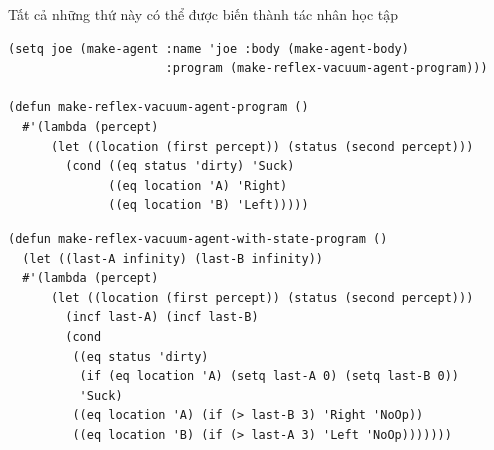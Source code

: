 \documentclass{article}
\begin{document}
\begin{huge}
Tất cả những thứ này có thể được biến thành tác nhân học tập



\textwidth
{}



\medskip



\bigskip

\begin{verbatim}
(setq joe (make-agent :name 'joe :body (make-agent-body)
                      :program (make-reflex-vacuum-agent-program)))

(defun make-reflex-vacuum-agent-program ()
  #'(lambda (percept)
      (let ((location (first percept)) (status (second percept)))
        (cond ((eq status 'dirty) 'Suck)
              ((eq location 'A) 'Right)
              ((eq location 'B) 'Left)))))
\end{verbatim}




\textwidth
{}



\medskip



\bigskip

\begin{verbatim}
(defun make-reflex-vacuum-agent-with-state-program ()
  (let ((last-A infinity) (last-B infinity))
  #'(lambda (percept)
      (let ((location (first percept)) (status (second percept)))
        (incf last-A) (incf last-B)
        (cond 
         ((eq status 'dirty) 
          (if (eq location 'A) (setq last-A 0) (setq last-B 0))
          'Suck)
         ((eq location 'A) (if (> last-B 3) 'Right 'NoOp))
         ((eq location 'B) (if (> last-A 3) 'Left 'NoOp)))))))
\end{verbatim}





\end{huge}
\end{document}
